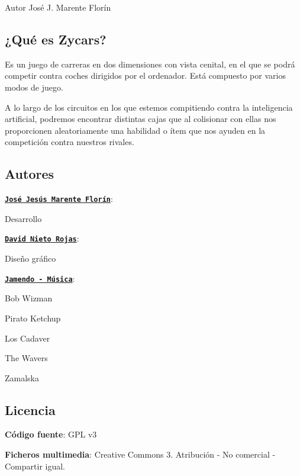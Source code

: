 \begin{DoxyAuthor}{\-Autor}
\-José \-J. \-Marente \-Florín
\end{DoxyAuthor}




\subsection*{¿\-Qué es \-Zycars?}

\-Es un juego de carreras en dos dimensiones con vista cenital, en el que se podrá competir contra coches dirigidos por el ordenador. \-Está compuesto por varios modos de juego. 

\-A lo largo de los circuitos en los que estemos compitiendo contra la inteligencia artificial, podremos encontrar distintas cajas que al colisionar con ellas nos proporcionen aleatoriamente una habilidad o ítem que nos ayuden en la competición contra nuestros rivales. 

\subsection*{\-Autores}


\begin{DoxyItemize}
\item {\bfseries \href{http://code.google.com/p/zycars/}{\tt \-José \-Jesús \-Marente \-Florín}}\-: 
\begin{DoxyItemize}
\item \-Desarrollo 
\end{DoxyItemize}
\item {\bfseries \href{http://www.deividart.com}{\tt \-David \-Nieto \-Rojas}}\-: 
\begin{DoxyItemize}
\item \-Diseño gráfico 
\end{DoxyItemize}
\item {\bfseries \href{http://www.jamendo.com}{\tt \-Jamendo -\/ \-Música}}\-: 
\begin{DoxyItemize}
\item \-Bob \-Wizman  
\item \-Pirato \-Ketchup 
\item \-Los \-Cadaver  
\item \-The \-Wavers 
\item \-Zamalska  
\end{DoxyItemize}
\end{DoxyItemize}

\subsection*{\-Licencia}


\begin{DoxyItemize}
\item {\bfseries \-Código fuente}\-: \-G\-P\-L v3 
\item {\bfseries \-Ficheros multimedia}\-: \-Creative \-Commons 3. \-Atribución -\/ \-No comercial -\/ \-Compartir igual. 
\end{DoxyItemize}